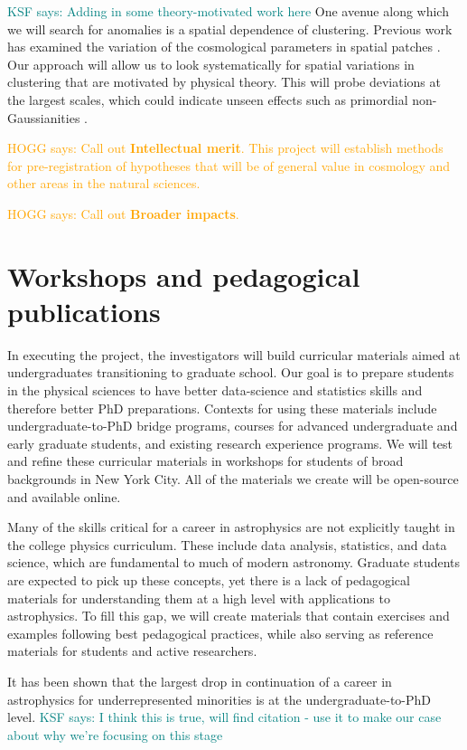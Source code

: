 \documentclass[12pt, fullpage, letterpaper]{article}
\newcommand{\KSF}[1]{\textcolor{teal}{KSF says: #1}}
\newcommand{\HOGG}[1]{\textcolor{orange}{HOGG says: #1}}
\begin{document}
\KSF{Adding in some theory-motivated work here}
One avenue along which we will search for anomalies is a spatial dependence of clustering.
Previous work has examined the variation of the cosmological parameters in spatial patches \citep{Mukherjee2018}.
Our approach will allow us to look systematically for spatial variations in clustering that are motivated by physical theory.
This will probe deviations at the largest scales, which could indicate unseen effects such as primordial non-Gaussianities \citep{Dalal2008}.

\HOGG{Call out \textbf{Intellectual merit}.
This project will establish methods for pre-registration of hypotheses that
will be of general value in cosmology and other areas in the natural
sciences.}

\HOGG{Call out \textbf{Broader impacts}.}

\section{Workshops and pedagogical publications}

In executing the project, the investigators will build curricular
materials aimed at undergraduates transitioning to graduate school.
Our goal is to prepare students
in the physical sciences to have better data-science and statistics
skills and therefore better PhD preparations.
Contexts for using these materials include undergraduate-to-PhD bridge programs, courses for advanced undergraduate and early graduate students, and existing research experience programs. 
We will test and refine these curricular materials in workshops for
students of broad backgrounds in New York City.
All of the materials we create will be open-source and available online. 

Many of the skills critical for a career in astrophysics are not explicitly taught in the college physics curriculum. 
These include data analysis, statistics, and data science, which are fundamental to much of modern astronomy.
Graduate students are expected to pick up these concepts, yet there is a lack of pedagogical materials for understanding them at a high level with applications to astrophysics.
To fill this gap, we will create materials that contain exercises and examples following best pedagogical practices, while also serving as reference materials for students and active researchers.

It has been shown that the largest drop in continuation of a career in astrophysics for underrepresented minorities is at the undergraduate-to-PhD level. \KSF{I think this is true, will find citation - use it to make our case about why we're focusing on this stage}
\end{document}
